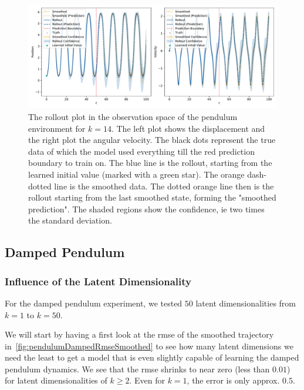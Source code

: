 			\begin{figure}
				\centering
				\includegraphics[width=\linewidth]{figures/results/pendulum/run-latent-dim-14/rollout-observations-N0.pdf}
				\caption{The rollout plot in the observation space of the pendulum environment for \(k = 14\). The left plot shows the displacement and the right plot the angular velocity. The black dots represent the true data of which the model used everything till the red prediction boundary to train on. The blue line is the rollout, starting from the learned initial value (marked with a green star). The orange dash-dotted line is the smoothed data. The dotted orange line then is the rollout starting from the last smoothed state, forming the "smoothed prediction". The shaded regions show the confidence, \ac{ie} two times the standard deviation.}
				\label{fig:pendulumRolloutL14}
			\end{figure}

	\subsection{Damped Pendulum}

		\subsubsection{Influence of the Latent Dimensionality}
			For the damped pendulum experiment, we tested \(50\) latent dimensionalities from \( k = 1 \) to \( k = 50 \).

			We will start by having a first look at the \ac{rmse} of the smoothed trajectory in~\autoref{fig:pendulumDampedRmseSmoothed} to see how many latent dimensions we need the least to get a model that is even slightly capable of learning the damped pendulum dynamics. We see that the \ac{rmse} shrinks to near zero (less than \( 0.01 \)) for latent dimensionalities of \( k \geq 2 \). Even for \( k = 1 \), the error is only approx. \( 0.5 \).

